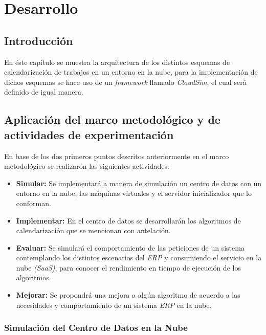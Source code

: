 \chead{}
\rhead{\thepage}



\chapter{Desarrollo}
\section*{Introducci\'on}

En \'este cap\'itulo se muestra la arquitectura de los distintos esquemas de calendarizaci\'on de trabajos en un entorno en la nube, para la implementaci\'on de dichos esquemas se hace uso de un \textit{framework} llamado \textit{CloudSim}, el cual ser\'a definido de igual manera.




\newpage
{}
\section{Aplicaci\'on del marco metodol\'ogico y de actividades de experimentaci\'on}

En base de los dos primeros puntos descritos anteriormente en el marco metodol\'ogico se realizar\'on las siguientes actividades:

\begin{itemize}
	\item \textbf{Simular:} Se implementar\'a a manera de simulaci\'on un centro de datos con un entorno en la nube, las m\'aquinas virtuales y el servidor inicializador que lo conforman.
	\item \textbf{Implementar:} En el centro de datos se desarrollar\'an los algoritmos de calendarizaci\'on que se mencionan con antelaci\'on.
	\item \textbf{Evaluar:} Se simular\'a el comportamiento de las peticiones de un sistema contemplando los distintos escenarios del \textit{ERP} y consumiendo el servicio en la nube \textit{(SaaS)}, para conocer el rendimiento en tiempo de ejecuci\'on de los algoritmos.
	\item \textbf{Mejorar:} Se propondr\'a una mejora a alg\'un algoritmo de acuerdo a las necesidades y comportamiento de un sistema \textit{ERP} en la nube.
\end{itemize}

\subsection{Simulaci\'on del Centro de Datos en la Nube}

